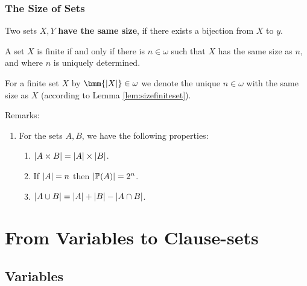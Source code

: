 \documentclass[12pt]{book}
\begin{document}
\subsection{The Size of Sets}
\label{sec:sizeofsets}

\begin{defi}\label{def:equalsize}
      Two sets $X, Y$ \textbf{have the same size}, if there exists a bijection from $X$ to $y$.
\end{defi}
\begin{lem}\label{lem:sizefiniteset}
      A set $X$ is finite if and only if there is $n \in \omega$ such that $X$ has the same size as $n$, and where $n$ is uniquely determined.
\end{lem}
\begin{defi}\label{def:sizefiniteset}
      For a finite set $X$ by $\bmm{\abs{X}} \in \omega$ we denote the unique $n \in \omega$ with the same size as $X$ (according to Lemma 
	  \ref{lem:sizefiniteset}).
\end{defi}
Remarks:
\begin{enumerate}
      \item For the sets $A , B$, we have the following properties:
      \begin{enumerate}
            \item $\lvert A \times B  \rvert= \lvert A \rvert \times \lvert B \rvert$.
	        \item If $\lvert A \rvert = n$ then $\lvert \operatorname{\mathbb{P}}(A) \rvert = 2^n$.
	        \item $\lvert A \cup B \rvert = \lvert A \rvert + \lvert B \rvert - \lvert A \cap B \rvert$.
      \end{enumerate} 
\end{enumerate}
\chapter{From Variables to Clause-sets}
\label{cha:vartocls}

\section{Variables}
\label{sec:Variables}
\end{document}
